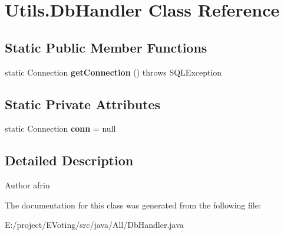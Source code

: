 \hypertarget{class_utils_1_1_db_handler}{}\section{Utils.\+Db\+Handler Class Reference}
\label{class_utils_1_1_db_handler}
\subsection*{Static Public Member Functions}
\begin{DoxyCompactItemize}
\item 
\mbox{\label{class_utils_1_1_db_handler_a028e9bf66efb3d8733ea7e681aa8ffde}} 
static Connection {\bfseries get\+Connection} ()  throws S\+Q\+L\+Exception
\end{DoxyCompactItemize}
\subsection*{Static Private Attributes}
\begin{DoxyCompactItemize}
\item 
\mbox{\label{class_utils_1_1_db_handler_a069d34bd6f48457c77123b491a213bfe}} 
static Connection {\bfseries conn} = null
\end{DoxyCompactItemize}


\subsection{Detailed Description}
\begin{DoxyAuthor}{Author}
afrin 
\end{DoxyAuthor}


The documentation for this class was generated from the following file\+:\begin{DoxyCompactItemize}
\item 
E\+:/project/\+E\+Voting/src/java/\+All/Db\+Handler.\+java\end{DoxyCompactItemize}
